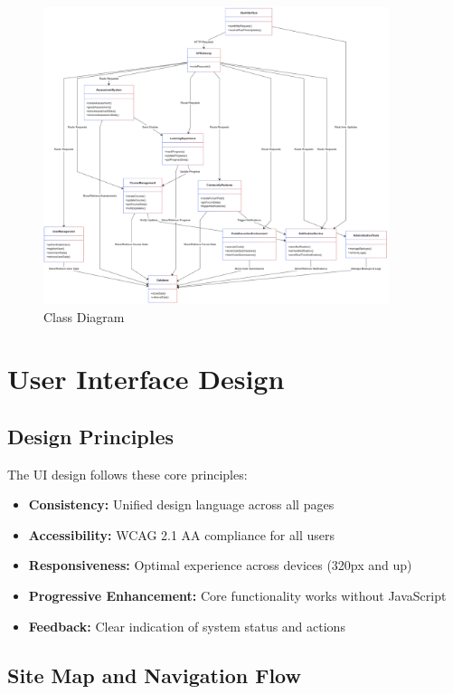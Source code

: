 \documentclass[a4paper, 11pt]{scrreprt}
\begin{document}
\begin{figure}[ht]
    \centering
    \includegraphics[width=0.9\textwidth]{class_diagram.png}
    \caption{Class Diagram}
\end{figure}

\chapter{User Interface Design}

\section{Design Principles}
The UI design follows these core principles:
\begin{itemize}
    \item \textbf{Consistency:} Unified design language across all pages
    \item \textbf{Accessibility:} WCAG 2.1 AA compliance for all users
    \item \textbf{Responsiveness:} Optimal experience across devices (320px and up)
    \item \textbf{Progressive Enhancement:} Core functionality works without JavaScript
    \item \textbf{Feedback:} Clear indication of system status and actions
\end{itemize}

\section{Site Map and Navigation Flow}
\end{document}
